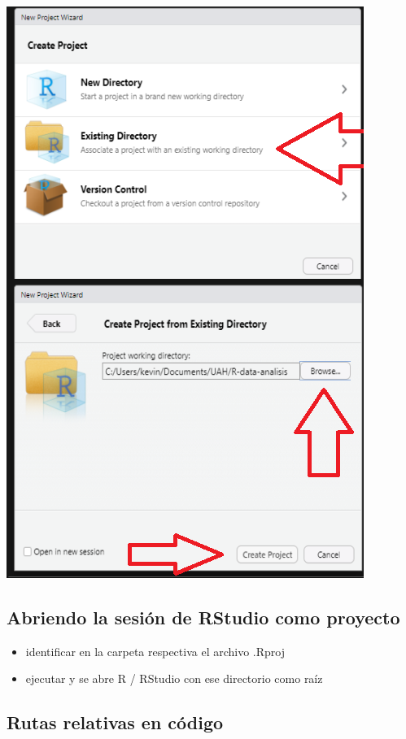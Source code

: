 \documentclass[
  letterpaper,
  DIV=11,
  numbers=noendperiod]{scrartcl}
\begin{document}
\includegraphics{images/project2.png}

\subsection{Abriendo la sesión de RStudio como
proyecto}\label{abriendo-la-sesiuxf3n-de-rstudio-como-proyecto}

\begin{itemize}
\item
  identificar en la carpeta respectiva el archivo .Rproj
\item
  ejecutar y se abre R / RStudio con ese directorio como raíz
\end{itemize}

\subsection{Rutas relativas en
código}\label{rutas-relativas-en-cuxf3digo}
\end{document}
